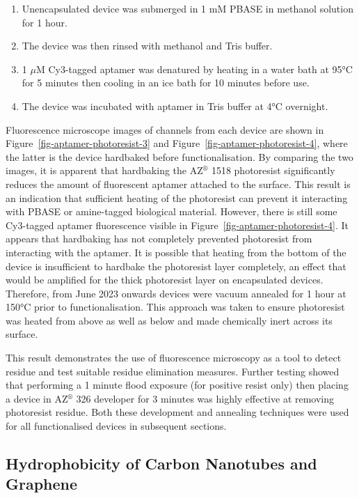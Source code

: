 \documentclass[
  a4paper,
]{scrbook}
\begin{document}
\begin{enumerate}
\def\labelenumi{\arabic{enumi}.}
\item
  Unencapsulated device was submerged in 1 mM PBASE in methanol solution
  for 1 hour.
\item
  The device was then rinsed with methanol and Tris buffer.
\item
  1 \(\mu\)M Cy3-tagged aptamer was denatured by heating in a water bath
  at 95°C for 5 minutes then cooling in an ice bath for 10 minutes
  before use.
\item
  The device was incubated with aptamer in Tris buffer at 4°C overnight.
\end{enumerate}

Fluorescence microscope images of channels from each device are shown in
Figure~\ref{fig-aptamer-photoresist-3} and
Figure~\ref{fig-aptamer-photoresist-4}, where the latter is the device
hardbaked before functionalisation. By comparing the two images, it is
apparent that hardbaking the AZ\(^\circledR\) 1518 photoresist
significantly reduces the amount of fluorescent aptamer attached to the
surface. This result is an indication that sufficient heating of the
photoresist can prevent it interacting with PBASE or amine-tagged
biological material. However, there is still some Cy3-tagged aptamer
fluorescence visible in Figure~\ref{fig-aptamer-photoresist-4}. It
appears that hardbaking has not completely prevented photoresist from
interacting with the aptamer. It is possible that heating from the
bottom of the device is insufficient to hardbake the photoresist layer
completely, an effect that would be amplified for the thick photoresist
layer on encapsulated devices. Therefore, from June 2023 onwards devices
were vacuum annealed for 1 hour at 150°C prior to functionalisation.
This approach was taken to ensure photoresist was heated from above as
well as below and made chemically inert across its surface.

This result demonstrates the use of fluorescence microscopy as a tool to
detect residue and test suitable residue elimination measures. Further
testing showed that performing a 1 minute flood exposure (for positive
resist only) then placing a device in AZ\(^\circledR\) 326 developer for
3 minutes was highly effective at removing photoresist residue. Both
these development and annealing techniques were used for all
functionalised devices in subsequent sections.

\hypertarget{sec-hydrophobicity}{%
\subsection{Hydrophobicity of Carbon Nanotubes and
Graphene}\label{sec-hydrophobicity}}
\end{document}
